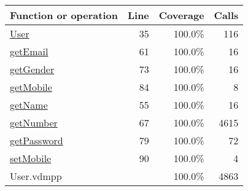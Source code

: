 \bigskip
\begin{longtable}{|l|r|r|r|}
\hline
Function or operation & Line & Coverage & Calls \\
\hline
\hline
\hyperref[User:35]{User} & 35&100.0\% & 116 \\
\hline
\hyperref[getEmail:61]{getEmail} & 61&100.0\% & 16 \\
\hline
\hyperref[getGender:73]{getGender} & 73&100.0\% & 16 \\
\hline
\hyperref[getMobile:84]{getMobile} & 84&100.0\% & 8 \\
\hline
\hyperref[getName:55]{getName} & 55&100.0\% & 16 \\
\hline
\hyperref[getNumber:67]{getNumber} & 67&100.0\% & 4615 \\
\hline
\hyperref[getPassword:79]{getPassword} & 79&100.0\% & 72 \\
\hline
\hyperref[setMobile:90]{setMobile} & 90&100.0\% & 4 \\
\hline
\hline
User.vdmpp & & 100.0\% & 4863 \\
\hline
\end{longtable}

